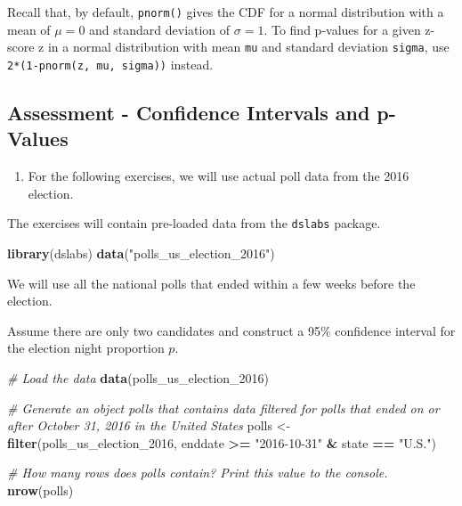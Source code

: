 \documentclass[
]{article}
\newenvironment{Shaded}{\begin{snugshade}}{\end{snugshade}}
\newcommand{\CommentTok}[1]{\textcolor[rgb]{0.56,0.35,0.01}{\textit{#1}}}
\newcommand{\DecValTok}[1]{\textcolor[rgb]{0.00,0.00,0.81}{#1}}
\newcommand{\KeywordTok}[1]{\textcolor[rgb]{0.13,0.29,0.53}{\textbf{#1}}}
\newcommand{\NormalTok}[1]{#1}
\newcommand{\OperatorTok}[1]{\textcolor[rgb]{0.81,0.36,0.00}{\textbf{#1}}}
\newcommand{\StringTok}[1]{\textcolor[rgb]{0.31,0.60,0.02}{#1}}
\providecommand{\tightlist}{%
  \setlength{\itemsep}{0pt}\setlength{\parskip}{0pt}}
\begin{document}
Recall that, by default, \texttt{pnorm()} gives the CDF for a normal
distribution with a mean of \(\mu = 0\) and standard deviation of
\(\sigma = 1\). To find p-values for a given z-score z in a normal
distribution with mean \texttt{mu} and standard deviation
\texttt{sigma}, use \texttt{2*(1-pnorm(z,\ mu,\ sigma))} instead.

\hypertarget{assessment---confidence-intervals-and-p-values}{%
\subsection{Assessment - Confidence Intervals and
p-Values}\label{assessment---confidence-intervals-and-p-values}}

\begin{enumerate}
\def\labelenumi{\arabic{enumi}.}
\tightlist
\item
  For the following exercises, we will use actual poll data from the
  2016 election.
\end{enumerate}

The exercises will contain pre-loaded data from the \texttt{dslabs}
package.

\begin{Shaded}
\begin{Highlighting}[]
\KeywordTok{library}\NormalTok{(dslabs)}
\KeywordTok{data}\NormalTok{(}\StringTok{"polls\_us\_election\_2016"}\NormalTok{)}
\end{Highlighting}
\end{Shaded}

We will use all the national polls that ended within a few weeks before
the election.

Assume there are only two candidates and construct a 95\% confidence
interval for the election night proportion \(p\).

\begin{Shaded}
\begin{Highlighting}[]
\CommentTok{\# Load the data}
\KeywordTok{data}\NormalTok{(polls\_us\_election\_}\DecValTok{2016}\NormalTok{)}

\CommentTok{\# Generate an object \textasciigrave{}polls\textasciigrave{} that contains data filtered for polls that ended on or after October 31, 2016 in the United States}
\NormalTok{polls \textless{}{-}}\StringTok{ }\KeywordTok{filter}\NormalTok{(polls\_us\_election\_}\DecValTok{2016}\NormalTok{, enddate }\OperatorTok{\textgreater{}=}\StringTok{ "2016{-}10{-}31"} \OperatorTok{\&}\StringTok{ }\NormalTok{state }\OperatorTok{==}\StringTok{ "U.S."}\NormalTok{)}

\CommentTok{\# How many rows does \textasciigrave{}polls\textasciigrave{} contain? Print this value to the console.}
\KeywordTok{nrow}\NormalTok{(polls)}
\end{Highlighting}
\end{Shaded}
\end{document}
